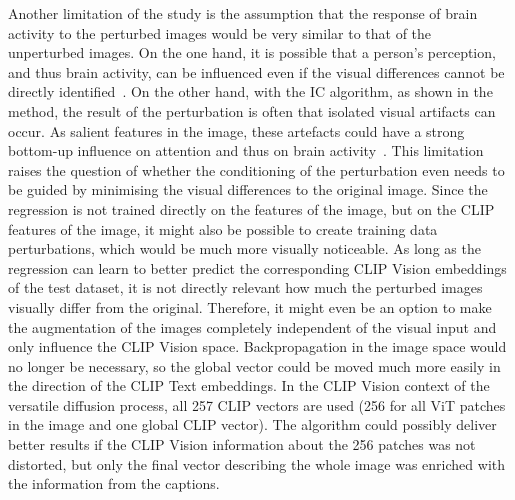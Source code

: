 Another limitation of the study is the assumption that the response of brain activity to the perturbed images would be very similar to that of the unperturbed images. On the one hand, it is possible that a person's perception, and thus brain activity, can be influenced even if the visual differences cannot be directly identified~\cite{rensinkVisualSensingSeeing2004}. On the other hand, with the IC algorithm, as shown in the method, the result of the perturbation is often that isolated visual artifacts can occur. As salient features in the image, these artefacts could have a strong bottom-up influence on attention and thus on brain activity~\cite{wolfeFiveFactorsThat2017}. This limitation raises the question of whether the conditioning of the perturbation even needs to be guided by minimising the visual differences to the original image. Since the regression is not trained directly on the features of the image, but on the CLIP features of the image, it might also be possible to create training data perturbations, which would be much more visually noticeable. As long as the regression can learn to better predict the corresponding CLIP Vision embeddings of the test dataset, it is not directly relevant how much the perturbed images visually differ from the original. Therefore, it might even be an option to make the augmentation of the images completely independent of the visual input and only influence the CLIP Vision space. Backpropagation in the image space would no longer be necessary, so the global vector could be moved much more easily in the direction of the CLIP Text embeddings. In the CLIP Vision context of the versatile diffusion process, all 257 CLIP vectors are used (256 for all ViT patches in the image and one global CLIP vector). The algorithm could possibly deliver better results if the CLIP Vision information about the 256 patches was not distorted, but only the final vector describing the whole image was enriched with the information from the captions. 



